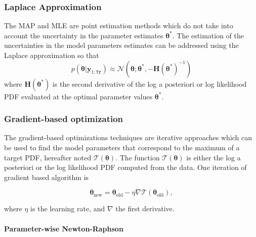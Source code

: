 \subsubsection{Laplace Approximation}

The MAP and MLE are point estimation methods which do not take into account the uncertainty in the parameter estimates $\bm\theta^{*}$. 
The estimation of the uncertainties in the model parameters estimates can be addressed using the Laplace approximation \cite{gelman2014bayesian} so that
$$p(\bm\theta|\mathbf{y}_{1:\mathtt{Tr}})  \approx  \mathcal{N}\left(\bm\theta;\bm\theta^{*},-\mathbf{H}(\bm\theta^{*})^{-1}\right)
\label{EQ: LaA}
$$
where $\mathbf{H}(\bm\theta^{*})$ is the second derivative of the log a posteriori or log likelihood PDF evaluated at the optimal parameter values $\bm\theta^{*}$. 

\subsubsection{Gradient-based optimization}

The gradient-based optimizations techniques are iterative approaches which can be used to find the model parameters that correspond to the maximum of a target PDF, hereafter noted $\mathcal{T}(\bm{\theta})$.
The function $\mathcal{T}(\bm{\theta})$  is either the log a posteriori or the log likelihood PDF computed from the data.
One iteration of gradient based algorithm is

\begin{equation}
{\bm\theta}_{\text{new}}  = {\bm\theta}_{\text{old}} - \eta \nabla \mathcal{T}(\bm{\theta}_{\text{old}}),
\label{EQ:GBA}
\end{equation}

where $\eta$ is the learning rate, and $\nabla$ the first derivative.

\paragraph{Parameter-wise Newton-Raphson}

